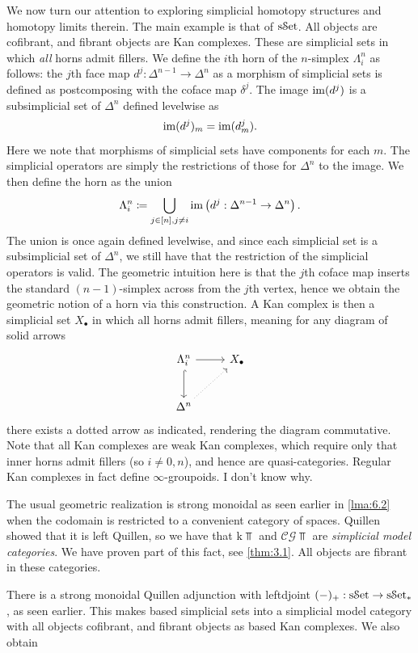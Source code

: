 We now turn our attention to exploring simplicial homotopy structures and homotopy limits therein. The main example is that of $\mathrm{s}\mathcal{S}\mathrm{et}$. All objects are cofibrant, and fibrant objects are Kan complexes. These are simplicial sets in which \emph{all} horns admit fillers. We define the $i$th horn of the $n$-simplex $\Lambda_i^n$ as follows: the $j$th face map $d^j : \Delta^{n-1}  \to \Delta^{n} $ as a morphism of simplicial sets is defined as postcomposing with the coface map $\delta^j$. The image $\operatorname{im}(d^j)$ is a subsimplicial set of $\Delta^n$ defined levelwise as
\[
	\operatorname{im}(d^j)_m=\operatorname{im}(d^j_m)
.\]
Here we note that morphisms of simplicial sets have components for each $m$. The simplicial operators are simply the restrictions of those for $\Delta^n$ to the image. We then define the horn as the union
\[
	\Lambda_i^n \coloneqq \bigcup_{j\in [n],j\neq i} \operatorname{im}\left(d^j : \Delta^{n-1}  \to \Delta^n\right)
.\]
The union is once again defined levelwise, and since each simplicial set is a subsimplicial set of $\Delta^n$, we still have that the restriction of the simplicial operators is valid. The geometric intuition here is that the $j$th coface map inserts the standard $(n-1)$-simplex across from the $j$th vertex, hence we obtain the geometric notion of a horn via this construction. A Kan complex is then a simplicial set $X_{\bullet} $ in which all horns admit fillers, meaning for any diagram of solid arrows
\[\begin{tikzcd}[row sep = 2.5em, column sep = 2.5em]
\Lambda_i^n\ar[r] \ar[hook, d]  & X_{\bullet}  \\
\Delta^n\ar[ur, dotted]  & 
\end{tikzcd}\]
there exists a dotted arrow as indicated, rendering the diagram commutative. Note that all Kan complexes are weak Kan complexes, which require only that inner horns admit fillers (so $i\neq 0,n$), and hence are quasi-categories. Regular Kan complexes in fact define $\infty $-groupoids. I don't know why.

The usual geometric realization is strong monoidal as seen earlier in \cref{lma:6.2} when the codomain is restricted to a convenient category of spaces. Quillen showed that it is left Quillen, so we have that $\mathrm{k} \Top $ and $\mathcal{C} \mathcal{G} \Top $ are \emph{simplicial model categories}. We have proven part of this fact, see \cref{thm:3.1}. All objects are fibrant in these categories.

There is a strong monoidal Quillen adjunction with leftdjoint $(-)_+: \mathrm{s}\mathcal{S}\mathrm{et} \to \mathrm{s}\mathcal{S}\mathrm{et}_*$, as seen earlier. This makes based simplicial sets into a simplicial model category with all objects cofibrant, and fibrant objects as based Kan complexes. We also obtain

